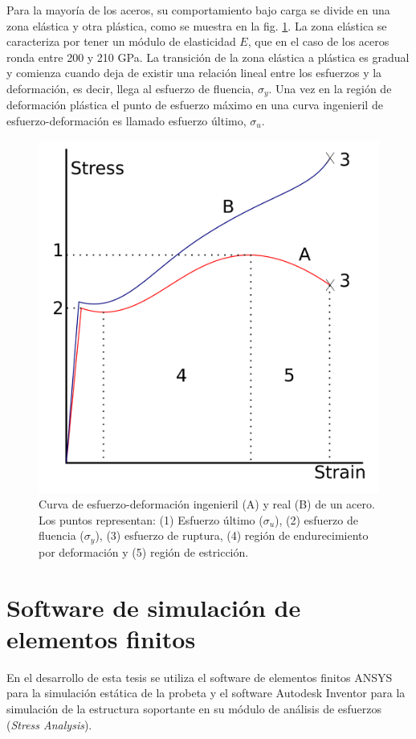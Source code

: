 Para la mayoría de los aceros, su comportamiento bajo carga se divide en una zona elástica y otra plástica, como se muestra en la fig. \ref{fig:esf-def_curve}. La zona elástica se caracteriza por tener un módulo de elasticidad $E$, que en el caso de los aceros ronda entre 200 y 210 GPa. La transición de la zona elástica a plástica es gradual y comienza cuando deja de existir una relación lineal entre los esfuerzos y la deformación, es decir, llega al esfuerzo de fluencia, $\sigma_y$. Una vez en la región de deformación plástica el punto de esfuerzo máximo en una curva ingenieril de esfuerzo-deformación es llamado esfuerzo último, $\sigma_u$.

\bigskip

\begin{figure}[h!]
\centering
\includegraphics[width=0.6\linewidth]{Imagenes/strain-stress_curve.png}
\caption{Curva de esfuerzo-deformación ingenieril (A) y real (B) de un acero. Los puntos representan: (1) Esfuerzo último ($\sigma_u$), (2) esfuerzo de fluencia ($\sigma_y$), (3) esfuerzo de ruptura, (4) región de endurecimiento por deformación y (5) región de estricción. \cite{richfield}}
\label{fig:esf-def_curve}
\end{figure}

\newpage

\section{Software de simulación de elementos finitos}

En el desarrollo de esta tesis se utiliza el software de elementos finitos ANSYS para la simulación estática de la probeta y el software Autodesk Inventor para la simulación de la estructura soportante en su módulo de análisis de esfuerzos (\textit{Stress Analysis}).

